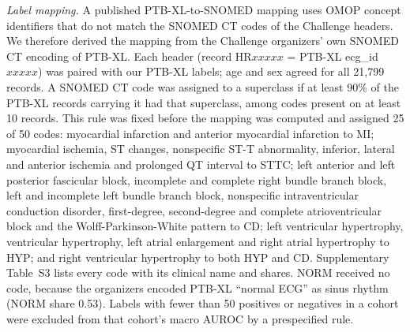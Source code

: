 \documentclass{wlscirep}
\begin{document}
\emph{Label mapping.} A published PTB-XL-to-SNOMED mapping \cite{strodthoff2023ptbxlplus,strodthoff2023ptbxlplusdata} uses OMOP concept identifiers that do not match the SNOMED CT codes of the Challenge headers. We therefore derived the mapping from the Challenge organizers' own SNOMED CT encoding of PTB-XL. Each header (record HR$xxxxx$ = PTB-XL ecg\_id $xxxxx$) was paired with our PTB-XL labels; age and sex agreed for all 21{,}799 records. A SNOMED CT code was assigned to a superclass if at least 90\% of the PTB-XL records carrying it had that superclass, among codes present on at least 10 records. This rule was fixed before the mapping was computed and assigned 25 of 50 codes: myocardial infarction and anterior myocardial infarction to MI; myocardial ischemia, ST changes, nonspecific ST-T abnormality, inferior, lateral and anterior ischemia and prolonged QT interval to STTC; left anterior and left posterior fascicular block, incomplete and complete right bundle branch block, left and incomplete left bundle branch block, nonspecific intraventricular conduction disorder, first-degree, second-degree and complete atrioventricular block and the Wolff-Parkinson-White pattern to CD; left ventricular hypertrophy, ventricular hypertrophy, left atrial enlargement and right atrial hypertrophy to HYP; and right ventricular hypertrophy to both HYP and CD. Supplementary Table~S3 lists every code with its clinical name and shares. NORM received no code, because the organizers encoded PTB-XL ``normal ECG'' as sinus rhythm (NORM share 0.53). Labels with fewer than 50 positives or negatives in a cohort were excluded from that cohort's macro AUROC by a prespecified rule.
\end{document}
